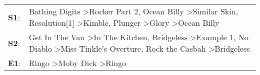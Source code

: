 \begin{supertabular}{p{0.03\textwidth}p{0.92\textwidth}}
 \textbf{S1}:  &  Bathing Digits\textsuperscript{} \textgreater \enspace Rocker Part 2\textsuperscript{}, \enspace Ocean Billy\textsuperscript{} \textgreater \enspace Similar Skin\textsuperscript{}, \enspace Resolution[1]\textsuperscript{} \textgreater \enspace Kimble\textsuperscript{}, \enspace Plunger\textsuperscript{} \textgreater \enspace Glory\textsuperscript{} \textgreater \enspace Ocean Billy\textsuperscript{}  \enspace  \\
 \textbf{S2}:  &                                Get In The Van\textsuperscript{} \textgreater \enspace In The Kitchen\textsuperscript{}, \enspace Bridgeless\textsuperscript{} \textgreater \enspace Example 1\textsuperscript{}, \enspace No Diablo\textsuperscript{} \textgreater \enspace Miss Tinkle's Overture\textsuperscript{}, \enspace Rock the Casbah\textsuperscript{} \textgreater \enspace Bridgeless\textsuperscript{}  \enspace  \\
 \textbf{E1}:  &                                                                                                                                                                                                                                                                                             Ringo\textsuperscript{} \textgreater \enspace Moby Dick\textsuperscript{} \textgreater \enspace Ringo\textsuperscript{}  \enspace  \\
\end{supertabular}
